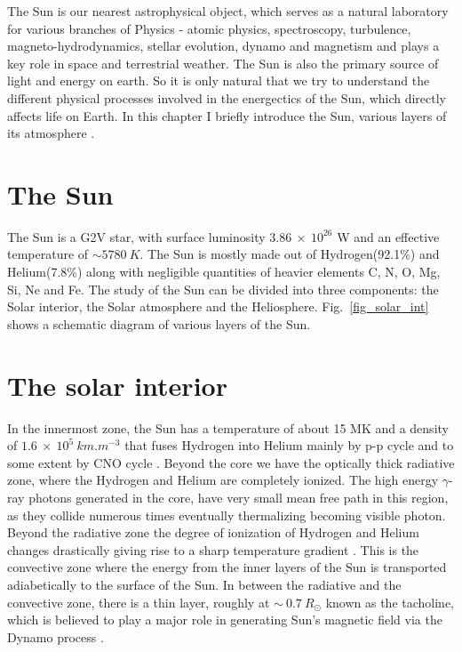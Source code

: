 \justifying

The Sun is our nearest astrophysical object, which serves as a natural laboratory for various branches of Physics - atomic physics, spectroscopy, turbulence, magneto-hydrodynamics, stellar evolution, dynamo and magnetism and plays a key role in  space and terrestrial weather. The Sun is also the primary source of light and energy on earth. So it is only natural that we try to understand the different physical processes involved in the energectics of the Sun, which directly affects life on Earth. In this chapter I briefly introduce the Sun, various layers of its atmosphere . 

\section{The Sun}\label{sun}

The Sun is a G2V star, with surface luminosity $3.86~\times~10^{26}$ W and an effective temperature of $\sim 5780~K$. The Sun is mostly made out of Hydrogen(92.1\%) and Helium(7.8\%) along with negligible quantities of heavier elements C, N, O, Mg, Si, Ne and Fe. The study of the Sun can be divided into three components: the Solar interior, the Solar atmosphere and the Heliosphere. Fig.~\ref{fig_solar_int} shows a schematic diagram of various layers of the Sun. 

\section{The solar interior}\label{solar_int}

In the innermost zone, the Sun has a temperature of about 15 MK and a density of $1.6~\times~10^{5}~km.m^{-3}$ that fuses Hydrogen into Helium mainly by p-p cycle \citep{bethe38} and to some extent by CNO cycle \citep{bethe39}. Beyond the core we have the optically thick radiative zone, where the Hydrogen and Helium are completely ionized. The high energy $\gamma$-ray photons generated in the core, have very small mean free path in this region, as they collide numerous times eventually thermalizing  becoming visible photon. Beyond the radiative zone the degree of ionization of Hydrogen and Helium changes drastically giving rise to a sharp temperature gradient . This is the convective zone where the energy from the inner layers of the Sun is transported adiabetically to the surface of the Sun. In between the radiative and the convective zone, there is a thin layer, roughly at $\sim~0.7~R_{\odot}$ known as the tacholine, which is believed to play a major role in generating Sun's magnetic field via the Dynamo process \citep{corbard01}.


